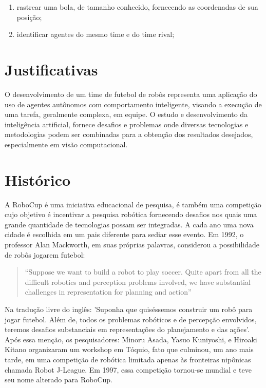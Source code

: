 \begin{enumerate}
	\item rastrear uma bola, de tamanho conhecido, fornecendo as coordenadas de sua posição;
	\item identificar agentes do mesmo time e do time rival;
\end{enumerate}

\section{Justificativas}
\label{Jus}
O desenvolvimento de um time de futebol de robôs representa uma aplicação do uso de agentes autônomos com comportamento inteligente, visando a execução de uma tarefa, geralmente complexa, em equipe. O estudo e desenvolvimento da inteligência artificial, fornece desafios e problemas onde diversas tecnologias e metodologias podem ser combinadas para a obtenção dos resultados desejados, especialmente em visão computacional.



\section{Histórico}
\label{His}
A RoboCup é uma iniciativa educacional de pesquisa, é também uma competição cujo objetivo é incentivar a pesquisa robótica fornecendo desafios nos quais uma grande quantidade de tecnologias possam ser integradas. A cada ano uma nova cidade é escolhida em um pais diferente para sediar esse evento. Em 1992, o professor Alan Mackworth, em suas próprias palavras, considerou a possibilidade de robôs jogarem futebol:

\begin{quote}
``Suppose we want to build a robot to play soccer. Quite apart from all the difficult robotics and perception problems involved, we have substantial challenges in representation for planning and action'' \\ \cite{Mackworth}
\end{quote} 

Na tradução livre do inglês:  'Suponha que quiséssemos construir um robô para jogar futebol. Além de, todos os problemas robóticos e de percepção envolvidos, teremos desafios substanciais em representações do planejamento e das ações'. Após essa menção, os pesquisadores: Minoru Asada, Yasuo Kuniyoshi, e Hiroaki Kitano organizaram um workshop em Tóquio, fato que culminou, um ano mais tarde, em uma competição de robótica limitada apenas às fronteiras nipônicas chamada Robot J-League. Em 1997, essa competição tornou-se mundial e teve seu nome alterado para RoboCup. 


